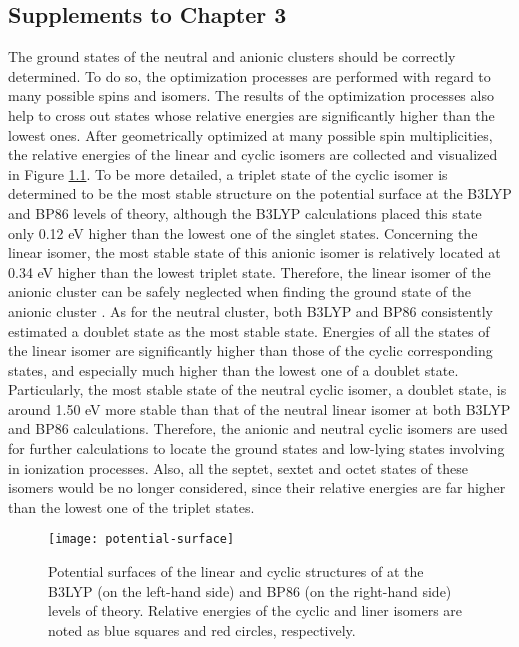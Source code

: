 \begin{refsection}

\chapter{Supplements to Chapter 3}\label{appendix:a3}




The ground states of the neutral and anionic clusters  should be correctly determined. To do so, the optimization processes are performed with regard to many possible spins and isomers. The results of the optimization processes also help to cross out states whose relative energies are significantly higher than the lowest ones. After geometrically optimized at many possible spin multiplicities, the relative energies of the linear and cyclic isomers are collected and visualized in Figure \ref{a3fig:surface}. To be more detailed, a triplet state of the cyclic isomer is determined to be the most stable structure on the potential surface at the B3LYP and BP86 levels of theory, although the B3LYP calculations placed this state only 0.12 eV higher than the lowest one of the singlet states. Concerning the linear isomer, the most stable state of this anionic isomer is relatively located at 0.34 eV higher than the lowest triplet state. Therefore, the linear isomer of the anionic cluster can be safely neglected when finding the ground state of the anionic cluster . As for the neutral cluster, both B3LYP and BP86 consistently estimated a doublet state as the most stable state. Energies of all the states of the linear isomer are significantly higher than those of the cyclic corresponding states, and especially much higher than the lowest one of a doublet state. Particularly, the most stable state of the neutral cyclic isomer, a doublet state, is around 1.50 eV more stable than that of the neutral linear isomer at both B3LYP and BP86 calculations. Therefore, the anionic and neutral cyclic isomers are used for further calculations to locate the ground states and low-lying states involving in ionization processes. Also, all the septet, sextet and octet states of these isomers would be no longer considered, since their relative energies are far higher than the lowest one of the triplet states.




\begin{figure}[htb!]
	\centering
	\texttt{[image: potential-surface]}
	\caption{Potential surfaces of the linear and cyclic structures of  at the B3LYP (on the left-hand side) and BP86 (on the right-hand side) levels of theory. Relative energies of the cyclic and liner isomers are noted as blue squares and red circles, respectively.}
	\label{a3fig:surface}
\end{figure}





\end{refsection}
